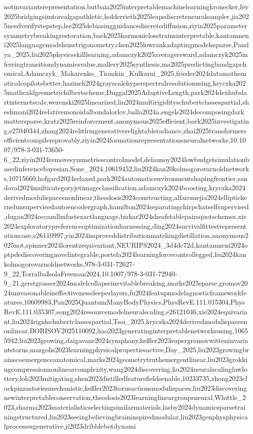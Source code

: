 notinvariantsrepresentation,butbaia2025interpretablemachinelearningkronecker,fey2025bridgingsimtorealgapathletic,holderrieth2025leapsdiscreteneuralsampler,jia2025needverifystepstep,lee2025debiasingguidancediscretediffusion,ziyin2025parametersymmetrybreakingrestoration,baek2025harmoniclosstrainsinterpretable,kantamneni2025languagemodelsusetrigonometry,chen2025lowrankadaptingmodelssparse,Pandya_2025,liu2025physicsskilllearning,adamczyk2025averagereward,adamczyk2025inferringtransitiondynamicsvalue,mallery2025synthesis,ma2025predictingbandgapchemical,Adamczyk_Makarenko_Tiomkin_Kulkarni_2025,frieder2024datamathematicalcopilotsbetter,hazineh2024grayscalehyperspectralresolutionusing,kryczka2025mathcaldgeometrichilbertscheme,Duggal2025AdaptiveLength,park2024dexhubdartinternetscale,werenski2025linearized,liu2024multirigidityschubertclassespartial,sheshmani2024relativemonoidalbondalorlov,balla2024a,engels2024decomposingdarkmattersparse,kratz2025reinforcement,anonymous2025efficient,baek2025investigating,e27040344,zhang2024relitlrmgenerativerelightableradiance,zhai2025transformersefficientcompilersprovably,ziyin2024formationrepresentationsneuralnetworks,10.1007/978-3-031-73650-6_22,ziyin2024removesymmetriescontrolmodel,delaunoy2024lowbudgetsimulationbasedinferencebayesian,Sone_2024,10619452,liu2024kan20kolmogorovarnoldnetworks,10715660,hofgard2024relaxed,park2024automaticenvironmentshapingfrontier,sandoval2024multicategoryjetimageclassification,adamczyk2024boosting,kryczka2024derivedmodulispacesnonlinear,theodosis2024constructing,alfaromejia2024elliptickernelunsupervisedautoencodergraph,hamilton2024separatingchirpchatselfsupervised,dugan2024occamllmfastexactlanguage,birkar2024sheafstablepairsquotschemes,xie2024exploratorypreferenceoptimizationharnessing,ding2024survivalfittestrepresentationcase,e26110997,yin2024improveddistributionmatchingdistillation,anonymous2025not,spinner2024lorentzequivariant,NEURIPS2024_3d4dc72d,kantamneni2024optpdediscoveringnovelintegrable,portela2024learningforcecontrollegged,liu2024kankolmogorovarnoldnetworks,978-3-031-72627-9_22,TorralbaIsolaFreeman2024,10.1007/978-3-031-72940-9_21,gerstgrasser2024modelcollapseinevitablebreaking,marks2025sparse,gromov2024unreasonableineffectivenessdeeperlayers,fu2024featupmodelagnosticframeworkfeatures,10609983,Pan2025QuantumManyBodyPhysics,PhysRevE.111.015304,PhysRevE.111.035307,song2024resourcemodelneuralscaling,e26121046,xie2024equivariant,liu2024rigidschubertclassespartial,Tsoi_2025,kryczka2024derivedmodulispacesnonlinear,BORISOV2025110092,liao2023generatinginterpretablenetworksusing,10655942,liu2023growing,daigavane2024symphony,keßler2023supergromovwitteninvariantstorus,margolis2023learningphysicalpropertiesactive,Day_2025,liu2023growingbrainscoemergenceanatomical,marks2024geometrytruthemergentlinear,liu2023grokkingcompressionnonlinearcomplexity,wang2024discovering,liu2024neuralscalinglawlottery,loh2023mitigating,shen2023distilledfeaturefieldsenable,10233735,zhong2023clockpizzastoriesmechanistic,keßler2023torusactionsmodulispaces,liu2023discoveringnewinterpretableconservation,theodosis2023learninglineargroupsneural,Whittle_2023,sharma2023materialisticselectingsimilarmaterials,lasby2024dynamicsparsetrainingstructured,liu2023seeingbelievingbraininspiredmodular,liu2023genphysphysicalprocessesgenerative,ji2023dribblebotdynami